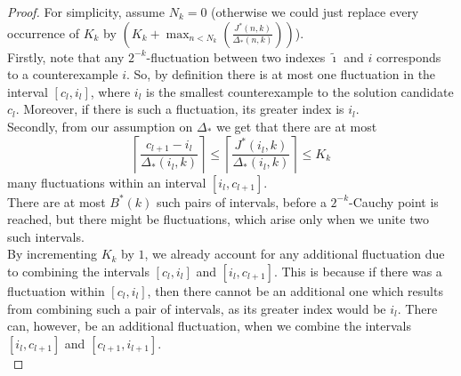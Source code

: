 \begin{proof}
For simplicity, assume $N_k=0$ (otherwise we could just replace every occurrence 
of $K_k$ by $(K_k+\max_{n<N_k}(\frac{J^*(n,k)}{\Delta_*(n,k)}))$).\\
Firstly, note that any $2^{-k}$-fluctuation between two indexes $\tilde{\imath}$ and $i$ corresponds to a counterexample $i$. So, by definition there 
is at most one fluctuation in the interval $[c_l,i_l]$, where 
$i_l$ is the smallest counterexample to the solution 
candidate $c_l$. Moreover, if there is such a fluctuation, its greater index is $i_l$.\\
Secondly, from our assumption on $\Delta_*$ we get that there are at most
\[
\left\lceil \frac{c_{l+1}-i_l}{\Delta_*(i_l,k)} \right\rceil \leq \left\lceil \frac{J^*(i_l,k)}{\Delta_*(i_l,k)} \right\rceil \leq K_k
\]
many fluctuations within an interval $[i_l,c_{l+1}]$.\\
There are at most $B^*(k)$ such pairs of intervals, before a $2^{-k}$-Cauchy point is reached, but there might be fluctuations, which arise only when we
unite two such intervals.\\
By incrementing $K_k$ by $1$, we already account for any additional fluctuation due to
combining the intervals $[c_l,i_l]$ and $[i_l,c_{l+1}]$. This is because if there was a fluctuation within $[c_l,i_l]$, then there cannot be an additional one which results from combining such a pair of intervals, as its greater index would be $i_l$. There can, however, be an additional fluctuation, when we combine the intervals $[i_l,c_{l+1}]$ and $[c_{l+1},i_{l+1}]$.\\
\end{proof}

